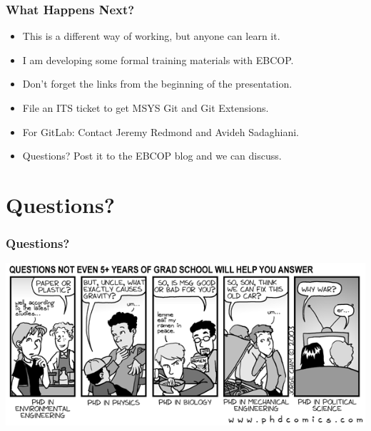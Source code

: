 \documentclass{beamer}
\begin{document}
\begin{frame} %
  \frametitle{What Happens Next?}
  \begin{itemize}
  \item This is a different way of working, but anyone can learn it.
  \item I am developing some formal training materials with EBCOP.
  \item Don't forget the links from the beginning of the presentation.
  \item File an ITS ticket to get MSYS Git and Git Extensions.
  \item For GitLab: Contact Jeremy Redmond and Avideh Sadaghiani.
  \item Questions? Post it to the EBCOP blog and we can discuss.
  \end{itemize}
\end{frame}

\section{Questions?} %

\begin{frame} %
 \frametitle{Questions?}
 \includegraphics[width=\textwidth]{./img/questions.png}
\end{frame}
\end{document}

